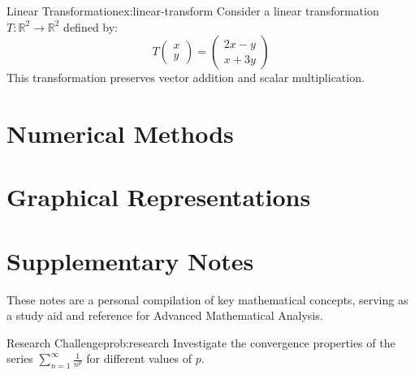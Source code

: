 \documentclass[12pt,a4paper]{article}
\begin{document}
\begin{Example}{Linear Transformation}{ex:linear-transform}
    Consider a linear transformation $T: \mathbb{R}^2 \to \mathbb{R}^2$ defined by:
    \[T\begin{pmatrix}x \\ y\end{pmatrix} = \begin{pmatrix}2x - y \\ x + 3y\end{pmatrix}\]
    This transformation preserves vector addition and scalar multiplication.
\end{Example}

\section{Numerical Methods}

\begin{algorithm}[H]
    \SetAlgoLined
    \caption{Selection Sort Algorithm}
\end{algorithm}

\section{Graphical Representations}

\begin{figure}[h]
    \centering
\end{figure}

\section{Supplementary Notes}

\begin{note}
    These notes are a personal compilation of key mathematical concepts, serving as a study aid and reference for Advanced Mathematical Analysis.
\end{note}

\begin{Problem}{Research Challenge}{prob:research}
    Investigate the convergence properties of the series $\sum_{n=1}^{\infty} \frac{1}{n^p}$ for different values of $p$.
\end{Problem}
\end{document}
